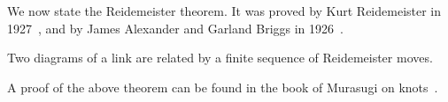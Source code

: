 We now state the Reidemeister theorem. It was proved by Kurt Reidemeister in 1927~\cite{reidemeister}, and by James Alexander and Garland Briggs in 1926~\cite{alexanderbriggs}.

\begin{thm}[Reidemeister]
    Two diagrams of a link are related by a finite sequence of Reidemeister moves.
\end{thm}

A proof of the above theorem can be found in the book of Murasugi on knots~\cite[chp.~4]{murasugi}.

